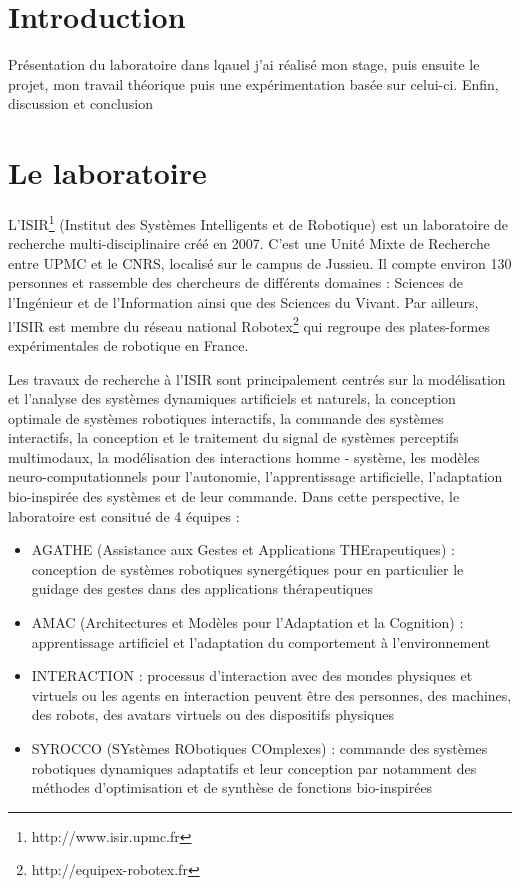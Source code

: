 \documentclass{llncs}
\begin{document}



\section{Introduction}

Présentation du laboratoire dans lqauel j'ai réalisé mon stage, puis ensuite le projet, mon travail théorique puis une expérimentation basée sur celui-ci. Enfin, discussion et conclusion

\section{Le laboratoire}

L'ISIR\footnote{http://www.isir.upmc.fr} (Institut des Systèmes Intelligents et de Robotique) est un laboratoire de recherche multi-disciplinaire créé en 2007. C'est une Unité Mixte de Recherche entre UPMC et le CNRS, localisé sur le campus de Jussieu. Il compte environ 130 personnes et rassemble des chercheurs de différents domaines : Sciences de l’Ingénieur et de l’Information ainsi que des Sciences du Vivant. Par ailleurs, l'ISIR est membre du réseau national Robotex\footnote{http://equipex-robotex.fr} qui regroupe des plates-formes expérimentales de robotique en France.

Les travaux de recherche à l'ISIR sont principalement centrés sur la modélisation et l'analyse des systèmes dynamiques artificiels et naturels, la conception optimale de systèmes robotiques interactifs, la commande des systèmes interactifs, la conception et le traitement du signal de systèmes perceptifs multimodaux, la modélisation des interactions homme - système, les modèles neuro-computationnels pour l’autonomie, l'apprentissage artificielle, l'adaptation bio-inspirée des systèmes et de leur commande. Dans cette perspective, le laboratoire est consitué de 4 équipes :
\begin{itemize}
\item AGATHE (Assistance aux Gestes et Applications THErapeutiques) : conception de systèmes robotiques synergétiques pour en particulier le guidage des gestes dans des applications thérapeutiques
\item AMAC (Architectures et Modèles pour l'Adaptation et la Cognition) : apprentissage artificiel et l’adaptation du comportement à l’environnement
\item INTERACTION : processus d’interaction avec des mondes physiques et virtuels ou les agents en interaction peuvent être des personnes, des machines, des robots, des avatars virtuels ou des dispositifs physiques
\item SYROCCO (SYstèmes RObotiques COmplexes) : commande des systèmes robotiques dynamiques adaptatifs et leur conception par notamment des méthodes d’optimisation et de synthèse de fonctions bio-inspirées
\end{itemize}
\end{document}
